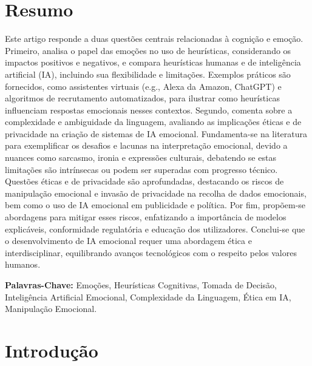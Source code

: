 \documentclass[a4paper,12pt]{report}
\begin{document}
	
	\newpage
	\thispagestyle{empty}
	\mbox{}
	\newpage
	
	
	\section*{Resumo} 
	
	Este artigo responde a duas questões centrais relacionadas à cognição e emoção. Primeiro, analisa o papel das emoções no uso de heurísticas, considerando os impactos positivos e negativos, e compara heurísticas humanas e de inteligência artificial (IA), incluindo sua flexibilidade e limitações. Exemplos práticos são fornecidos, como assistentes virtuais (e.g., Alexa da Amazon, ChatGPT) e algoritmos de recrutamento automatizados, para ilustrar como heurísticas influenciam respostas emocionais nesses contextos. Segundo, comenta sobre a complexidade e ambiguidade da linguagem, avaliando as implicações éticas e de privacidade na criação de sistemas de IA emocional. Fundamenta-se na literatura para exemplificar os desafios e lacunas na interpretação emocional, devido a nuances como sarcasmo, ironia e expressões culturais, debatendo se estas limitações são intrínsecas ou podem ser superadas com progresso técnico. Questões éticas e de privacidade são aprofundadas, destacando os riscos de manipulação emocional e invasão de privacidade na recolha de dados emocionais, bem como o uso de IA emocional em publicidade e política. Por fim, propõem-se abordagens para mitigar esses riscos, enfatizando a importância de modelos explicáveis, conformidade regulatória e educação dos utilizadores. Conclui-se que o desenvolvimento de IA emocional requer uma abordagem ética e interdisciplinar, equilibrando avanços tecnológicos com o respeito pelos valores humanos.
		
	\vspace{4em}
	
	\noindent\textbf{Palavras-Chave:} \normalsize{Emoções, Heurísticas Cognitivas, Tomada de Decisão, Inteligência Artificial Emocional, Complexidade da Linguagem, Ética em IA, Manipulação Emocional.}
	
	\newpage	
	
	
	\section{Introdução}
	
\end{document}
